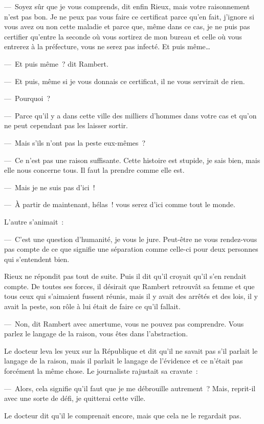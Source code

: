\documentclass[french,twoside]{book} %
\begin{document}
— Soyez sûr que je vous comprends, dit enfin Rieux, mais votre raisonnement n’est pas bon. Je ne peux pas vous faire ce certificat parce qu’en fait, j’ignore si vous avez ou non cette maladie et parce que, même dans ce cas, je ne puis pas certifier qu’entre la seconde où vous sortirez de mon bureau et celle où vous entrerez à la préfecture, vous ne serez pas infecté. Et puis même…\par
— Et puis même ? dit Rambert.\par
— Et puis, même si je vous donnais ce certificat, il ne vous servirait de rien.\par
— Pourquoi ?\par
— Parce qu’il y a dans cette ville des milliers d’hommes dans votre cas et qu’on ne peut cependant pas les laisser sortir.\par
— Mais s’ils n’ont pas la peste eux-mêmes ?\par
— Ce n’est pas une raison suffisante. Cette histoire est stupide, je sais bien, mais elle nous concerne tous. Il faut la prendre comme elle est.\par
— Mais je ne suis pas d’ici !\par
— À partir de maintenant, hélas ! vous serez d’ici comme tout le monde.\par
L’autre s’animait :\par
— C’est une question d’humanité, je vous le jure. Peut-être ne vous rendez-vous pas compte de ce que signifie une séparation comme celle-ci pour deux personnes qui s’entendent bien.\par
Rieux ne répondit pas tout de suite. Puis il dit qu’il croyait qu’il s’en rendait compte. De toutes ses forces, il désirait que Rambert retrouvât sa femme et que tous ceux qui s’aimaient fussent réunis, mais il y avait des arrêtés et des lois, il y avait la peste, son rôle à lui était de faire ce qu’il fallait.\par
— Non, dit Rambert avec amertume, vous ne pouvez pas comprendre. Vous parlez le langage de la raison, vous êtes dans l’abstraction.\par
Le docteur leva les yeux sur la République et dit qu’il ne savait pas s’il parlait le langage de la raison, mais il parlait le langage de l’évidence et ce n’était pas forcément la même chose. Le journaliste rajustait sa cravate :\par
— Alors, cela signifie qu’il faut que je me débrouille autrement ? Mais, reprit-il avec une sorte de défi, je quitterai cette ville.\par
Le docteur dit qu’il le comprenait encore, mais que cela ne le regardait pas.\par
\end{document}
